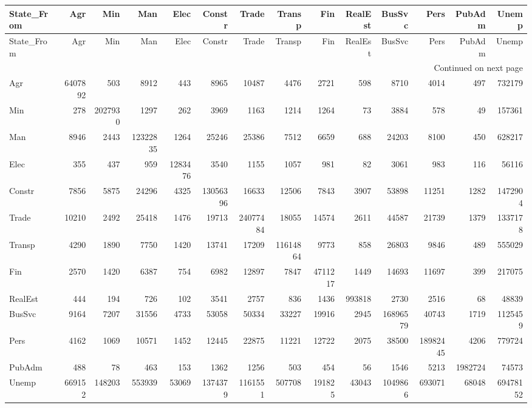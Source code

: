 \begin{longtable}{lrrrrrrrrrrrrr}
\toprule
State_From & Agr & Min & Man & Elec & Constr & Trade & Transp & Fin & RealEst & BusSvc & Pers & PubAdm & Unemp \\
\midrule
\endfirsthead
\toprule
State_From & Agr & Min & Man & Elec & Constr & Trade & Transp & Fin & RealEst & BusSvc & Pers & PubAdm & Unemp \\
\midrule
\endhead
\midrule
\multicolumn{14}{r}{Continued on next page} \\
\midrule
\endfoot
\bottomrule
\endlastfoot
Agr & 6407892 & 503 & 8912 & 443 & 8965 & 10487 & 4476 & 2721 & 598 & 8710 & 4014 & 497 & 732179 \\
Min & 278 & 2027930 & 1297 & 262 & 3969 & 1163 & 1214 & 1264 & 73 & 3884 & 578 & 49 & 157361 \\
Man & 8946 & 2443 & 12322835 & 1264 & 25246 & 25386 & 7512 & 6659 & 688 & 24203 & 8100 & 450 & 628217 \\
Elec & 355 & 437 & 959 & 1283476 & 3540 & 1155 & 1057 & 981 & 82 & 3061 & 983 & 116 & 56116 \\
Constr & 7856 & 5875 & 24296 & 4325 & 13056396 & 16633 & 12506 & 7843 & 3907 & 53898 & 11251 & 1282 & 1472904 \\
Trade & 10210 & 2492 & 25418 & 1476 & 19713 & 24077484 & 18055 & 14574 & 2611 & 44587 & 21739 & 1379 & 1337178 \\
Transp & 4290 & 1890 & 7750 & 1420 & 13741 & 17209 & 11614864 & 9773 & 858 & 26803 & 9846 & 489 & 555029 \\
Fin & 2570 & 1420 & 6387 & 754 & 6982 & 12897 & 7847 & 4711217 & 1449 & 14693 & 11697 & 399 & 217075 \\
RealEst & 444 & 194 & 726 & 102 & 3541 & 2757 & 836 & 1436 & 993818 & 2730 & 2516 & 68 & 48839 \\
BusSvc & 9164 & 7207 & 31556 & 4733 & 53058 & 50334 & 33227 & 19916 & 2945 & 16896579 & 40743 & 1719 & 1125459 \\
Pers & 4162 & 1069 & 10571 & 1452 & 12445 & 22875 & 11221 & 12722 & 2075 & 38500 & 18982445 & 4206 & 779724 \\
PubAdm & 488 & 78 & 463 & 153 & 1362 & 1256 & 503 & 454 & 56 & 1546 & 5213 & 1982724 & 74573 \\
Unemp & 669152 & 148203 & 553939 & 53069 & 1374379 & 1161551 & 507708 & 191825 & 43043 & 1049866 & 693071 & 68048 & 69478152 \\
\end{longtable}
